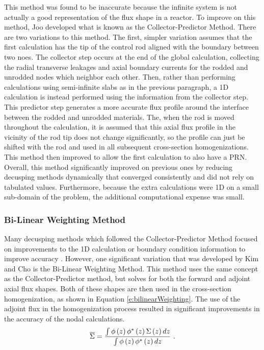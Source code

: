 This method was found to be inaccurate because the infinite system is not actually a good representation of the flux shape in a reactor.  To improve on this method, Joo developed what is known as the Collector-Predictor Method.  There are two variations to this method.  The first, simpler variation assumes that the first calculation has the tip of the control rod aligned with the boundary between two noes.  The collector step occurs at the end of the global calculation, collecting the radial transverse leakages and axial boundary currents for the rodded and unrodded nodes which neighbor each other.  Then, rather than performing calculations using semi-infinite slabs as in the previous paragraph, a 1D calculation is instead performed using the information from the collector step.  This predictor step generates a more accurate flux profile around the interface between the rodded and unrodded materials.  The, when the rod is moved throughout the calculation, it is assumed that this axial flux profile in the vicinity of the rod tip does not change significantly, so the profile can just be shifted with the rod and used in all subsequent cross-section homogenizations.  This method then improved to allow the first calculation to also have a PRN.  Overall, this method significantly improved on previous ones by reducing decusping methods dynamically that converged consistently and did not rely on tabulated values.  Furthermore, because the extra calculations were 1D on a small sub-domain of the problem, the additional computational expense was small.

\subsubsection{Bi-Linear Weighting Method}

Many decusping methods which followed the Collector-Predictor Method focused on improvements to the 1D calculation or boundary condition information to improve accuracy \cite{gehinThesis1992quasi,smith1992enhancementsStudxvickCoreManagementSystem,lee1998CuspingCorrection1DFineMeshFluxProfiles,downar2004PARCStheory}.  However, one significant variation that was developed by Kim and Cho \cite{kim1990BilinearWeighting} is the Bi-Linear Weighting Method.  This method uses the same concept as the Collector-Predictor method, but solves for both the forward and adjoint axial flux shapes.  Both of these shapes are then used in the cross-section homogenization, as shown in Equation \ref{e:bilinearWeighting}.  The use of the adjoint flux in the homogenization process resulted in significant improvements in the accuracy of the nodal calculations.
\begin{equation}\label{e:bilinearWeighting}
\overline{\Sigma} = \frac{\intop \phi\left(z\right) \phi^*\left(z\right) \Sigma\left(z\right) dz}{\intop \phi\left(z\right) \phi^*\left(z\right) dz}\ .
\end{equation}

